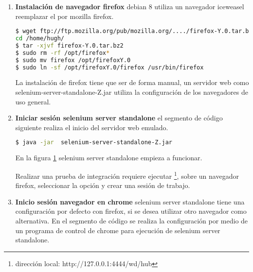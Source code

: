 \begin{itemize}
\begin{itemize}
\end{itemize}

\begin{enumerate}

\item \textbf{Instalación de navegador firefox} debian 8 utiliza un navegador
iceweasel reemplazar el por mozilla firefox.

\begin{lstlisting}[language=bash, caption={Instrucciones de instalación para mozilla firefox.}]
$ wget ftp://ftp.mozilla.org/pub/mozilla.org/..../firefox-Y.0.tar.bz2
cd /home/hugh/
$ tar -xjvf firefox-Y.0.tar.bz2
$ sudo rm -rf /opt/firefox*
$ sudo mv firefox /opt/firefoxY.0
$ sudo ln -sf /opt/firefoxY.0/firefox /usr/bin/firefox
\end{lstlisting}

La instalación de firefox tiene que ser de forma manual, un servidor web
como selenium-server-standalone-Z.jar utiliza la configuración de los
navegadores de uso general.

\item \textbf{Iniciar sesión selenium server standalone} el segmento de código
siguiente realiza el inicio del servidor web emulado.

\begin{lstlisting}[language=bash, caption={Ejecución de servidor server standalone.}]
$ java -jar  selenium-server-standalone-Z.jar
\end{lstlisting}

En la figura \ref{fig:Ejecución de selenium server standalone} selenium server
standalone empieza a funcionar.

\begin{figure}[!ht]
	\centering
	\label{fig:Ejecución de selenium server standalone}
\end{figure}

Realizar una  prueba de integración requiere ejecutar
\footnote{dirección local: http://127.0.0.1:4444/wd/hub}, sobre un
navegador firefox, seleccionar la opción y crear una sesión de trabajo.

\item \textbf{Inicio sesión navegador en chrome} selenium server standalone
tiene una configuración por defecto con firefox, si se desea utilizar otro
navegador como alternativa. En el segmento de código se realiza la
configuración por medio de un programa de control de chrome para ejecución
de selenium server standalone.


\end{enumerate}
\end{itemize}
